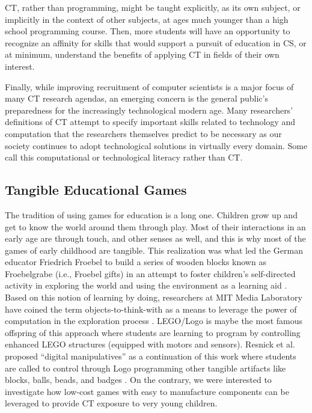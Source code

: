 \documentclass{acm_proc_article-sp}
\begin{document}
CT, rather than programming, might be taught explicitly, as its own subject, or implicitly in the context of other subjects, at ages much younger than a high school programming course.
Then, more students will have an opportunity to recognize an affinity for skills that would support a pursuit of education in CS, or at minimum, understand the benefits of applying CT in fields of their own interest.

Finally, while improving recruitment of computer scientists is a major focus of many CT research agendas, an emerging concern is the general public's preparedness for the increasingly technological modern age. Many researchers' definitions of CT attempt to specify important skills related to technology and computation that the researchers themselves predict to be necessary as our society continues to adopt technological solutions in virtually every domain. Some call this computational or technological literacy rather than CT.

\subsection{Tangible Educational Games}
\label{sec:ed_games}
The tradition of using games for education is a long one. Children grow up and get to know the world around them through play.
Most of their interactions in an early age are through touch, and other senses as well, and this is why most of the games of early childhood are tangible.
This realization was what led the German educator Friedrich Froebel to build a series of wooden blocks known as Froebelgrabe (i.e., Froebel gifts) in an attempt to foster children's self-directed activity in exploring the world and using the environment as a learning aid \cite{liebschner1992child}.
Based on this notion of learning by doing, researchers at MIT Media Laboratory have coined the term objects-to-think-with as a means to leverage the power of computation in the exploration process \cite{resnick1998digital,schweikardt2006roblocks}. LEGO/Logo is maybe the most famous offspring of this approach where students are learning to program by controlling enhanced LEGO structures (equipped with motors and sensors).
Resnick et al. proposed ``digital manipulatives'' as a continuation of this work where students are called to control through Logo programming other tangible artifacts like blocks, balls, beads, and badges \cite{liebschner1992child}.
On the contrary, we were interested to investigate how low-cost games with easy to manufacture components can be leveraged to provide CT exposure to very young children. 
\end{document}
